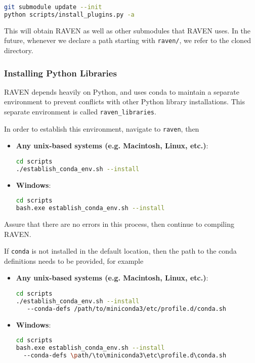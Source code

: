 \begin{lstlisting}[language=bash]
git submodule update --init
python scripts/install_plugins.py -a
\end{lstlisting}
This will obtain RAVEN as well as other submodules that RAVEN uses.  In the future, whenever we declare a path
starting with \texttt{raven/}, we refer to the cloned directory.




\subsubsection{Installing Python Libraries}
RAVEN depends heavily on Python, and uses conda to maintain a separate environment to prevent conflicts with
other Python library installations.  This separate environment is called \texttt{raven\_libraries}.

In order to establish this environment, navigate to \texttt{raven}, then
\begin{itemize}

  \item \textbf{Any unix-based systems (e.g. Macintosh, Linux, etc.)}:
\begin{lstlisting}[language=bash]
cd scripts
./establish_conda_env.sh --install
\end{lstlisting}
  \item \textbf{Windows}:
  \begin{lstlisting}[language=bash]
cd scripts
bash.exe establish_conda_env.sh --install
\end{lstlisting}

\end{itemize}
Assure that there are no errors in this process, then continue to compiling RAVEN.

\nb If \texttt{conda} is not installed in the default location, then the path to the conda definitions
needs to be provided, for example

\begin{itemize}

  \item \textbf{Any unix-based systems (e.g. Macintosh, Linux, etc.)}:
\begin{lstlisting}[language=bash]
cd scripts
./establish_conda_env.sh --install
   --conda-defs /path/to/miniconda3/etc/profile.d/conda.sh
\end{lstlisting}
  \item \textbf{Windows}:
  \begin{lstlisting}[language=bash]
cd scripts
bash.exe establish_conda_env.sh --install
  --conda-defs \path/\to\miniconda3\etc\profile.d\conda.sh
\end{lstlisting}
  
\end{itemize}

